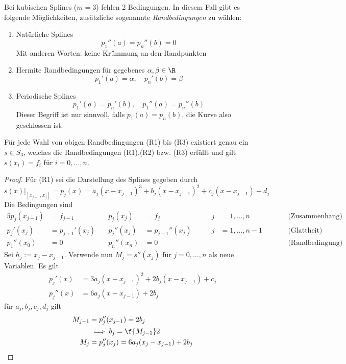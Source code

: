 \documentclass[11pt]{scrbook}
\begin{document}
Bei kubischen Splines ($m=3$) fehlen 2 Bedingungen.
In diesem Fall gibt es folgende Möglichkeiten, zusätzliche sogenannte \emph{Randbedingungen} zu wählen:
\begin{enumerate}[{(R}1{)}]
	\item
		Natürliche Splines
		\[
			p_1''(a) = p_n''(b)=0
		\]
		Mit anderen Worten: keine Krümmung an den Randpunkten
	\item
		Hermite Randbedingungen für gegebenes $\alpha, \beta \in \R$
		\[
			p_1'(a) = \alpha, \quad p_n'(b) = \beta
		\]
	\item
		Periodische Splines
		\[
			p_1'(a) = p_n'(b), \quad p_1''(a) = p_n''(b)
		\]
		Dieser Begriff ist nur sinnvoll, falls $p_1(a) = p_n(b)$, die Kurve also geschlossen ist.
\end{enumerate}

\begin{st}
	\label{1.32}
	Für jede Wahl von obigen Randbedingungen (R1) bis (R3) existiert genau ein $s\in S_3$, welches die Randbedingungen (R1),(R2) bzw. (R3) erfüllt und gilt $s(x_i)=f_i$ für $i=0,\dotsc,n$.
	\begin{proof}
		Für (R1) sei die Darstellung des Splines gegeben durch
		\[
			s(x)\big|_{[x_{j-1},x_j]} = p_j(x) = a_j(x-x_{j-1})^3 + b_j(x-x_{j-1})^2 + c_j(x-x_{j-1}) + d_j
		\]
		Die Bedingungen sind
		\begin{alignat*}{5}
			p_j(x_{j-1}) &= f_{j-1}& \quad p_j(x_j) &= f_j & \qquad j&=1,\dotsc,n & &\qquad \text{(Zusammenhang)} &\\
			p_j'(x_j) &= p_{j+1}'(x_j) & \quad p_j''(x_j) &= p_{j+1}''(x_j) &  \qquad j&=1,\dotsc,n-1 & &\qquad \text{(Glattheit)} &\\
			p_1''(x_0)&=0& \quad p_n''(x_n) &= 0 & & & &\qquad \text{(Randbedingung)} &
		\end{alignat*}
		Sei $h_j := x_j - x_{j-1}$.
		Verwende nun $M_j = s''(x_j)$ für $j=0,\dotsc,n$ als neue Variablen.
		Es gilt
		\begin{align*}
			p_j'(x) &= 3a_j(x-x_{j-1})^2 + 2b_j(x-x_{j-1})+c_j \\
			p_j''(x) &= 6a_j(x-x_{j-1}) + 2b_j
		\end{align*}
		für $a_j, b_j, c_j, d_j$ gilt
		\begin{align*}
			M_{j-1} &= p_j''(x_{j-1}) 
				= 2b_j  \\
				&\implies b_j
					=\f {M_{j-1}}2 \\
			M_j &= p_j''(x_j) 
				= 6a_j(x_j-x_{j-1}) + 2b_j \\

\end{align*}
\end{proof}
\end{st}
\end{document}
